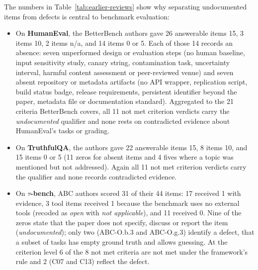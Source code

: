 \documentclass[10pt,conference]{IEEEtran}
\begin{document}
The numbers in Table~\ref{tab:earlier-reviews} show why separating undocumented items from defects is central to benchmark evaluation:
\begin{itemize}
\item On \textbf{HumanEval}, the BetterBench authors gave 26 answerable items 15, 3 items 10, 2 items n/a, and 14 items 0 or 5. Each of those 14 records an absence: seven unperformed design or evaluation steps (no human baseline, input sensitivity study, canary string, contamination task, uncertainty interval, harmful content assessment or peer-reviewed venue) and seven absent repository or metadata artifacts (no API wrapper, replication script, build status badge, release requirements, persistent identifier beyond the paper, metadata file or documentation standard). Aggregated to the 21 criteria BetterBench covers, all 11 not met criterion verdicts carry the \emph{undocumented} qualifier and none rests on contradicted evidence about HumanEval's tasks or grading.
\item On \textbf{TruthfulQA}, the authors gave 22 answerable items 15, 8 items 10, and 15 items 0 or 5 (11 zeros for absent items and 4 fives where a topic was mentioned but not addressed). Again all 11 not met criterion verdicts carry the qualifier and none records contradicted evidence.
\item On \textbf{$\tau$-bench}, ABC authors scored 31 of their 44 items: 17 received 1 with evidence, 3 tool items received 1 because the benchmark uses no external tools (recoded as \emph{open} with \emph{not applicable}), and 11 received 0. Nine of the zeros state that the paper does not specify, discuss or report the item (\emph{undocumented}); only two (ABC-O.b.3 and ABC-O.g.3) identify a defect, that a subset of tasks has empty ground truth and allows guessing. At the criterion level 6 of the 8 not met criteria are not met under the framework's rule and 2 (C07 and C13) reflect the defect.
\end{itemize}
\end{document}
